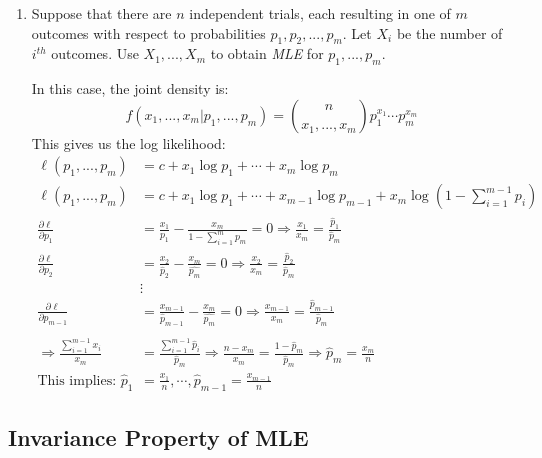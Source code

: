 \documentclass{article}
\begin{document}
\begin{enumerate}
    \item Suppose that there are $n$ independent trials, each resulting in one of $m$ outcomes with respect to probabilities $p_1,p_2,...,p_m$. Let $X_i$ be the number of $i^{th}$ outcomes. Use $X_1,...,X_m$ to obtain \textit{MLE} for $p_1,...,p_m$.
    
    In this case, the joint density is:
    \begin{equation*}
        f(x_1,...,x_m|p_1,...,p_m) = \binom{n}{x_1,...,x_m} p_1^{x_1} \cdots p_m^{x_m}
    \end{equation*}
    This gives us the log likelihood:
    \begin{equation*}
        \begin{split}
            \ell (p_1,...,p_m) &= c + x_1\log p_1 + \cdots + x_m \log p_m\\
            \ell(p_1,...,p_m) &= c + x_1\log p_1 + \cdots + x_{m-1}\log p_{m-1} + x_m \log \left(1 - \sum_{i=1}^{m-1} p_i \right)\\
            \frac{\partial\ell}{\partial p_1} &= \frac{x_1}{p_1} - \frac{x_m}{1-\sum_{i=1}^m p_m} = 0 \Rightarrow \frac{x_1}{x_m} = \frac{\hat{p}_1}{\hat{p}_m}\\
            \frac{\partial\ell}{\partial p_2} &= \frac{x_2}{\hat{p}_2} - \frac{x_m}{\hat{p_m}} = 0 \Rightarrow \frac{x_2}{x_m} = \frac{\hat{p}_2}{\hat{p}_m}\\
            &\vdots \\
            \frac{\partial\ell}{\partial p_{m-1}} &= \frac{x_{m-1}}{\hat{p}_{m-1}} - \frac{x_m}{\hat{p_m}} = 0 \Rightarrow \frac{x_{m-1}}{x_m} = \frac{\hat{p}_{m-1}}{\hat{p}_m}\\
            \\
            \Rightarrow \frac{\sum_{i=1}^{m-1} x_i}{x_m} &= \frac{\sum_{i=1}^{m-1} \hat{p}_i }{\hat{p}_m} \Rightarrow \frac{n-x_m}{x_m} = \frac{1-\hat{p}_m}{\hat{p}_m} \Rightarrow \hat{p}_m = \frac{x_m}{n}\\
            \text{This implies: } \hat{p}_1 &= \frac{x_1}{n}, \cdots, \hat{p}_{m-1} = \frac{x_{m-1}}{n}
        \end{split}
    \end{equation*}
\end{enumerate}

\subsection{Invariance Property of MLE}
\end{document}
